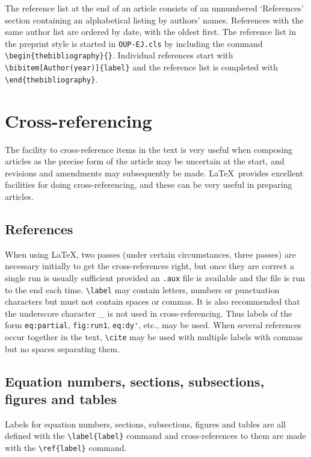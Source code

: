 \documentclass{OUP-EJ}
\begin{document}
The reference list at the end of an article consists of an
unnumbered `References' section containing an
alphabetical listing by authors' names. References with the same author list are ordered by date, with the oldest first.
The reference list in the
preprint style is started in \verb"OUP-EJ.cls" by including the command \verb"\begin{thebibliography}{}".
Individual references start with \verb"\bibitem[Author(year)]{label}" and the reference list is completed with \verb"\end{thebibliography}".


\section{Cross-referencing\label{xrefs}}

The facility to cross-reference items in the text is very useful when
composing articles as the precise form of the article may be uncertain at the start,
and  revisions and amendments may subsequently be made.
\LaTeX\ provides excellent facilities for doing cross-referencing,
and these can be very useful in preparing articles.

\subsection{References}
\label{refs}

When using \LaTeX , two passes (under certain circumstances, three passes)
are necessary initially to get the cross-references right,
but once they are correct a single run is usually sufficient provided an
\verb".aux" file is available and the file
is run to the end each time.  \verb"\label" may contain letters, numbers
or punctuation characters but must not contain spaces or commas. It is also
recommended that the underscore character \_{} is not used in cross-referencing. Thus labels of the form \verb"eq:partial", \verb"fig:run1", \verb"eq:dy'",
etc., may be used. When several
references occur together in the text, \verb"\cite" may be used with
multiple labels with commas but no spaces separating them.


\subsection{Equation numbers, sections, subsections, figures and
tables}
Labels for equation numbers, sections, subsections, figures and tables
are all defined with the \verb"\label{label}" command and cross-references
to them are made with the \verb"\ref{label}" command.
\end{document}
